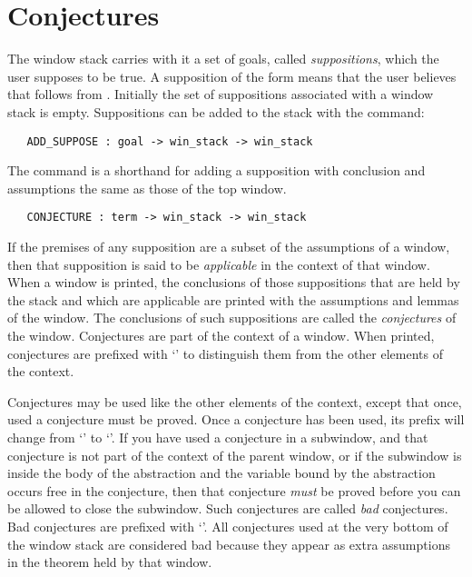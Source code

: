 \section{Conjectures}	\label{sec:con}

The window stack carries with it a set of goals, called 
{\it suppositions},
which the user supposes to be true.
A supposition of the form  means that the user believes that
 follows from .
Initially the set of suppositions associated with a window stack is empty.
Suppositions can be added to the stack with the command:
\begin{boxed}\begin{verbatim}
   ADD_SUPPOSE : goal -> win_stack -> win_stack
\end{verbatim}\end{boxed}
The command  is a shorthand for adding a supposition with
conclusion  and assumptions the same as those of the top window.
\begin{boxed}\begin{verbatim}
   CONJECTURE : term -> win_stack -> win_stack
\end{verbatim}\end{boxed}

If the premises of any supposition are a subset of the assumptions of a window,
then that supposition is said to be
{\it applicable}\/ in the context of that
window.
When a window is printed, the conclusions of those suppositions that
are held by the stack and which are applicable are printed with the 
assumptions and lemmas of the window.
The conclusions of such suppositions are called the 
{\it conjectures}\/ of the
window.
Conjectures are part of the context of a window.
When printed, conjectures are prefixed with
`' to distinguish them
from the other elements of the context.

Conjectures may be used like the other elements of the context,
except that once, used a conjecture must be proved.
Once a conjecture has been used, its prefix will change from `' to
`\ml{\$}'.
If you have used a conjecture in a subwindow, and that conjecture is not
part of the context of the parent window,
or if the subwindow is inside the body of the abstraction and the variable
bound by the abstraction occurs free in the conjecture,
then that conjecture {\it must\/}
be proved before you can be allowed to close the subwindow.
Such conjectures are called {\it bad\/}
conjectures.
Bad conjectures are prefixed with
`'.
All conjectures used at the very bottom of the window stack are considered bad
because they appear as extra assumptions in the theorem held by that window.

